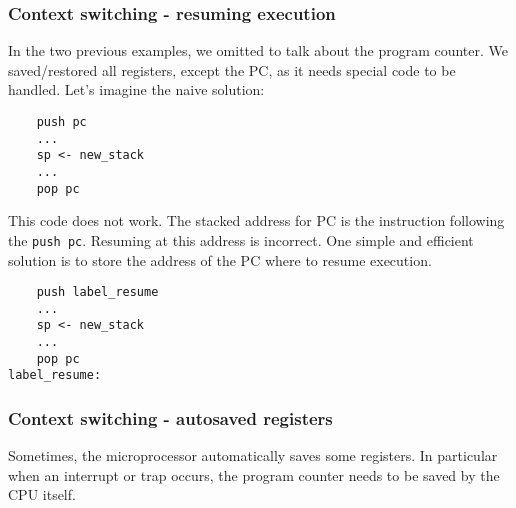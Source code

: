 
\begin{frame}[containsverbatim]
  \frametitle{Context switching - resuming execution}

  In the two previous examples, we omitted to talk about the program
  counter. We saved/restored all registers, except the PC, as it needs
  special code to be handled. Let's imagine the naive solution:

  \begin{verbatim}
    push pc
    ...
    sp <- new_stack
    ...
    pop pc
  \end{verbatim}

  This code does not work. The stacked address for PC is the
  instruction following the \verb|push pc|. Resuming at this address
  is incorrect. One simple and efficient solution is to store the
  address of the PC where to resume execution.

  \begin{verbatim}
    push label_resume
    ...
    sp <- new_stack
    ...
    pop pc
label_resume:
  \end{verbatim}

\end{frame}


\begin{frame}
  \frametitle{Context switching - autosaved registers}

  Sometimes, the microprocessor automatically saves some registers. In
  particular when an interrupt or trap occurs, the program counter
  needs to be saved by the CPU itself.

\end{frame}


